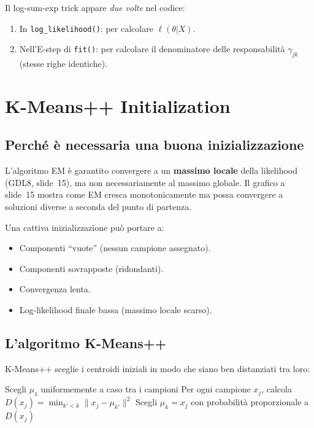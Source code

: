 \documentclass[11pt,a4paper]{article}
\newcommand{\refslide}[2]{\textsc{#1}, slide~#2}
\begin{document}
\begin{warnbox}
Il log-sum-exp trick appare \emph{due volte} nel codice:
\begin{enumerate}[nosep]
  \item In \texttt{log\_likelihood()}: per calcolare $\ell(\theta|X)$.
  \item Nell'E-step di \texttt{fit()}: per calcolare il denominatore
        delle responsabilità $\gamma_{jk}$ (stesse righe identiche).
\end{enumerate}
\end{warnbox}

\section{K-Means++ Initialization}\label{sec:kmeans}

\subsection{Perché è necessaria una buona inizializzazione}

L'algoritmo EM è garantito convergere a un \textbf{massimo locale}
della likelihood (\refslide{GDL8}{15}), ma non necessariamente al
massimo globale. Il grafico a slide~15 mostra come EM cresca
monotonicamente ma possa convergere a soluzioni diverse a seconda
del punto di partenza.

Una cattiva inizializzazione può portare a:
\begin{itemize}[nosep]
  \item Componenti ``vuote'' (nessun campione assegnato).
  \item Componenti sovrapposte (ridondanti).
  \item Convergenza lenta.
  \item Log-likelihood finale bassa (massimo locale scarso).
\end{itemize}

\subsection{L'algoritmo K-Means++}

K-Means++ sceglie i centroidi iniziali in modo che siano ben
distanziati tra loro:

\begin{algorithm}[H]
\caption{K-Means++ Initialization}
\begin{algorithmic}[1]
\State Scegli $\mu_1$ uniformemente a caso tra i campioni
  \State Per ogni campione $x_j$, calcola $D(x_j) = \min_{k' < k}
         \|x_j - \mu_{k'}\|^2$
  \State Scegli $\mu_k = x_j$ con probabilità proporzionale a $D(x_j)$
\EndFor
\end{algorithmic}
\end{algorithm}
\end{document}
